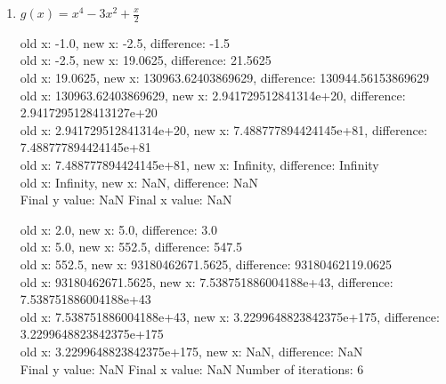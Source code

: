 \documentclass[12pt]{article}
\begin{document}
\begin{enumerate}
\item $g(x) = x^4 - 3x^2 + \frac{x}{2}$

\begin{footnotesize}
\begin{spacing}{-.8}
old x: -1.0, new x: -2.5, difference: -1.5\\
old x: -2.5, new x: 19.0625, difference: 21.5625\\
old x: 19.0625, new x: 130963.62403869629, difference: 130944.56153869629\\
old x: 130963.62403869629, new x: 2.941729512841314e+20, difference: 2.9417295128413127e+20\\
old x: 2.941729512841314e+20, new x: 7.488777894424145e+81, difference: 7.488777894424145e+81\\
old x: 7.488777894424145e+81, new x: Infinity, difference: Infinity\\
old x: Infinity, new x: NaN, difference: NaN\\
Final y value: NaN
Final x value: NaN
\end{spacing}
\end{footnotesize}

\vspace{.4in}

\begin{footnotesize}
\begin{spacing}{-.8}
old x: 2.0, new x: 5.0, difference: 3.0\\
old x: 5.0, new x: 552.5, difference: 547.5\\
old x: 552.5, new x: 93180462671.5625, difference: 93180462119.0625\\
old x: 93180462671.5625, new x: 7.538751886004188e+43, difference: 7.538751886004188e+43\\
old x: 7.538751886004188e+43, new x: 3.2299648823842375e+175, difference: 3.2299648823842375e+175\\
old x: 3.2299648823842375e+175, new x: NaN, difference: NaN\\
Final y value: NaN
Final x value: NaN
Number of iterations: 6
\end{spacing}
\end{footnotesize}

\vspace{.4in}



\end{enumerate}
\end{document}
